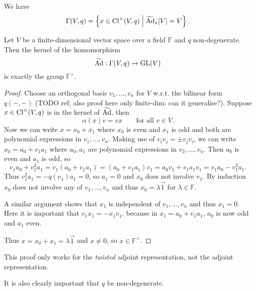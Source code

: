We have
\[ \Gamma(V,q) = \left\{ x\in\operatorname{Cl}^\times(V,q) \;\middle|\; \widetilde{\operatorname{Ad}}_x[V] = V \right\}. \]

\begin{proposition}
Let $V$ be a finite-dimensional vector space over a field $\mathbb{F}$ and $q$ non-degenerate. Then the kernel of the homomorphism
\[ \widetilde{\operatorname{Ad}}: \Gamma(V,q) \to \operatorname{GL}(V) \]
is exactly the group $\mathbb{F}^\times$.
\end{proposition}
\begin{proof}
Choose an orthogonal basis $v_1,\ldots, v_n$ for $V$ w.r.t. the bilinear form $q(-,-)$ (TODO ref; also proof here only finite-dim: can it generalise?). Suppose $x\in \operatorname{Cl}^\times(V,q)$ is in the kernel of $\widetilde{\operatorname{Ad}}$, then
\[ \alpha(x)v = vx \qquad \text{for all $v\in V$.} \]
Now we can write $x = x_0 + x_1$ where $x_0$ is even and $x_1$ is odd and both are polynomial expressions in $v_1,\ldots, v_n$. Making use of $v_iv_j = \pm v_jv_i$, we can write $x_0 = a_0 + v_1a_1$ where $a_0,a_1$ are polynomial expressions in $v_2,\ldots, v_n$. Then $a_0$ is even and $a_1$ is odd, so
\[ v_1a_0 + v_1^2a_1 = v_1(a_0+v_1a_1) = (a_0+v_1a_1)v_1 = a_0v_1 + v_1 a_1 v_1 = v_1a_0-v_1^2 a_1. \]
Thus $v^2_1a_1 = -q(v_1)a_1 = 0$, so $a_1=0$ and $x_0$ does not involve $v_1$. By induction $x_0$ does not involve any of $v_1,\ldots, v_n$ and thus $x_0 = \lambda \vec{1}$ for $\lambda\in\mathbb{F}$.

A similar argument shows that $x_1$ is independent of $v_1,\ldots, v_n$ and thus $x_1=0$. Here it is important that $v_1x_1 = -x_1v_1$, because in $x_1 = a_0 + v_1a_1$, $a_0$ is now odd and $a_1$ even.

Thus $x = x_0+x_1 = \lambda \vec{1}$ and $x\neq 0$, so $x\in \mathbb{F}^\times$.
\end{proof}
This proof only works for the \textit{twisted} adjoint representation, not the adjoint representation.

It is also clearly important that $q$ be non-degenerate.

